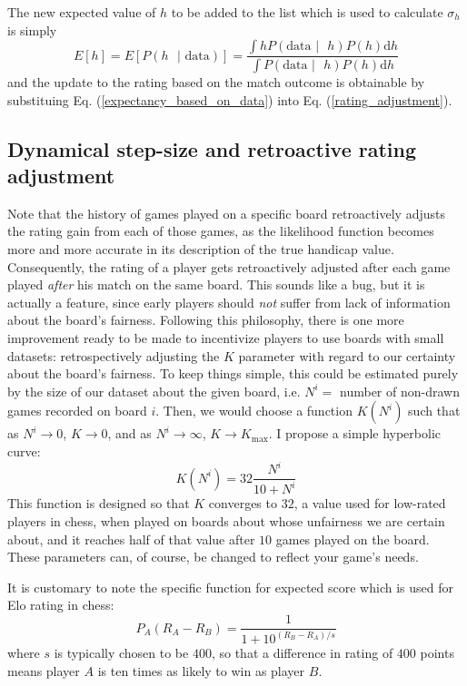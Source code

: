 \documentclass[12pt]{article}
\begin{document}
	The new expected value of $h$ to be added to the list which is used to calculate $\sigma_h$ is simply
	\begin{equation}
	E[h] = E[P(h\text{ } | \text{ data})] = \frac{\int hP(\text{data } | \text{ }h)P(h) \text{d}h}{\int P(\text{data } | \text{ }h)P(h) \text{d}h}
	\end{equation}
	and the update to the rating based on the match outcome is obtainable by substituing Eq. (\ref{expectancy_based_on_data}) into Eq. (\ref{rating_adjustment}).
	
	\subsection{Dynamical step-size and retroactive rating adjustment}
	
	Note that the history of games played on a specific board retroactively adjusts the rating gain from each of those games, as the likelihood function becomes more and more accurate in its description of the true handicap value. Consequently, the rating of a player gets retroactively adjusted after each game played \textit{after} his match on the same board. This sounds like a bug, but it is actually a feature, since early players should \textit{not} suffer from lack of information about the board's fairness. Following this philosophy, there is one more improvement ready to be made to incentivize players to use boards with small datasets: retrospectively adjusting the $K$ parameter with regard to our certainty about the board's fairness. To keep things simple, this could be estimated purely by the size of our dataset about the given board, i.e. $N^i=$ number of non-drawn games recorded on board $i$. Then, we would choose a function $K(N^i)$ such that as $N^i\to 0$, $K\to 0$, and as $N^i\to\infty$, $K\to K_\text{max}$. I propose a simple hyperbolic curve:
	\begin{equation}
	K(N^i)=32\frac{N^i}{10+N^i}
	\end{equation}
	This function is designed so that $K$ converges to $32$, a value used for low-rated players in chess, when played on boards about whose unfairness we are certain about, and it reaches half of that value after $10$ games played on the board. These parameters can, of course, be changed to reflect your game's needs.
	
	It is customary to note the specific function for expected score which is used for Elo rating in chess:
	$$P_A(R_A-R_B)=\frac{1}{1+10^{(R_B-R_A)/s}}$$
	where $s$ is typically chosen to be $400$, so that a difference in rating of $400$ points means player $A$ is ten times as likely to win as player $B$.
	
\end{document}
